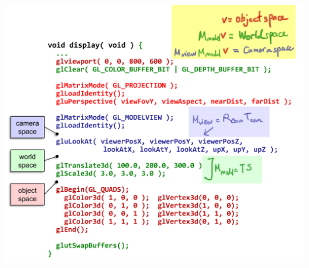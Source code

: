 \documentclass{beamer}
\begin{document}

\begin{frame}
    \centering
    \includegraphics[scale=0.4]{pg48-annot.png}
\end{frame}
\end{document}
